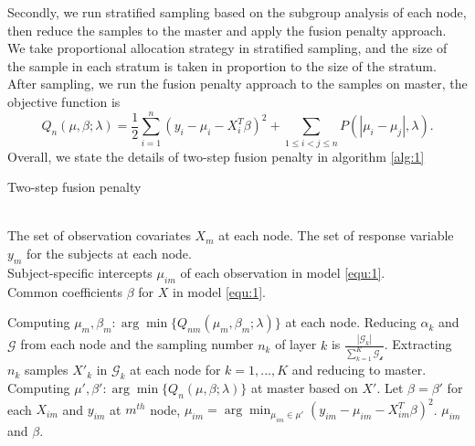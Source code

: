 \documentclass[review]{elsarticle}
\begin{document}
Secondly, we run stratified sampling based on the subgroup analysis of each node, then reduce the samples to the master and apply the fusion penalty approach. We take proportional allocation strategy in stratified sampling, and the size of the sample in each stratum is taken in proportion to the size of the stratum. After sampling, we run the fusion penalty approach to the samples on master, the objective function is
\begin{equation}
\label{equ:6}
Q_n(\mu,\beta;\lambda) = \frac{1}{2}\sum_{i=1}^n(y_i-\mu_i-X_i^T\beta)^2+\sum_{1\leq i<j\leq n}P(|\mu_i-\mu_j|,\lambda).
\end{equation}
Overall, we state the details of two-step fusion penalty in algorithm \ref{alg:1}
\begin{algorithm}
\caption{Two-step fusion penalty}
\label{alg:1}
\begin{algorithmic}[1]
\REQUIRE ~~\\
The set of observation covariates $X_m$ at each node.
The set of response variable $y_m$ for the subjects at each node.
\ENSURE ~~\\
Subject-specific intercepts $\mu_{im}$ of each observation in model \ref{equ:1}.\\
Common coefficients $\beta$ for $X$ in model \ref{equ:1}.

\STATE Computing $\mu_m,\beta_m: \arg\min\{Q_{nm}(\mu_m, \beta_m;\lambda)\}$ at each node. 
\label{step:1}
\STATE Reducing $\alpha_k$ and $\mathcal{G}$ from each node and the sampling number $n_k$ of layer $k$ is $ \frac{|\mathcal{G}_k|}{\sum_{k=1}^{K}\mathcal{G_k}}$.
\label{step:2}
\STATE Extracting $n_k$ samples $X'_k$ in $\mathcal{G}_k$ at each node for $k=1,...,K$ and reducing to master.
\label{step:3}
\STATE Computing $\mu',\beta':\arg\min\{Q_n(\mu,\beta;\lambda)\}$ at master based on $X'$.
\STATE Let $\beta=\beta'$ for each $X_{im}$ and $y_{im}$ at $m^{th}$ node, $\mu_{im}=\arg\min_{\mu_{im}\in\mu'}(y_{im}-\mu_{im}-X_{im}^T\beta)^2$. 
\RETURN $\mu_{im}$ and $\beta$.
\end{algorithmic}
\end{algorithm}
\end{document}
